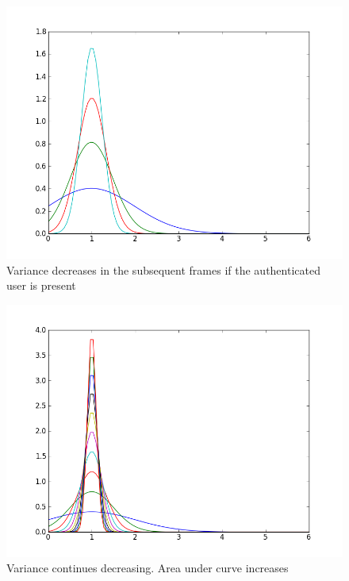 \documentclass[12pt]{article}			%
\begin{document}
\begin{figure}
	\caption{Variance decreases in the subsequent frames if the authenticated user is present}
	\centering
\includegraphics[scale=0.6]{img/mus_sig3.png}
\end{figure}
\begin{figure}
	\caption{Variance continues decreasing. Area under curve increases}
	\centering
\includegraphics[scale=0.6]{img/mus_sig4.png}
\end{figure}
\end{document}
